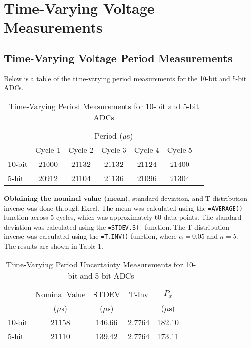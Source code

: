\section{Time-Varying Voltage Measurements}
\subsection{Time-Varying Voltage Period Measurements}

\noindent Below is a table of the time-varying period measurements for the 10-bit and 5-bit ADCs. 
\begin{table}[h]
    \centering
    \caption{Time-Varying Period Measurements for 10-bit and 5-bit ADCs}
    \begin{tabular}{lcccccc}
    \toprule
       & \multicolumn{5}{c}{Period ($\mu$s)}    \\
    \cmidrule{2-6}
       & Cycle 1    & Cycle 2   & Cycle 3   & Cycle 4   & Cycle 5    \\
    \midrule
    10-bit & 21000 & 21132 & 21132 & 21124 & 21400  \\
    5-bit  & 20912 & 21104 & 21136 & 21096 & 21304  \\
    \bottomrule
    \end{tabular}
\end{table}

\noindent \textbf{Obtaining the nominal value (mean)}, standard deviation, and T-distribution inverse was done through Excel. The mean was calculated using the \texttt{=AVERAGE()} function 
across 5 cycles, which was approximately 60 data points. The standard deviation was calculated using the \texttt{=STDEV.S()} function. 
The T-distribution inverse was calculated using the \texttt{=T.INV()} function, where $\alpha = 0.05$ and $n = 5$. The results are shown in Table 
\ref{tab:time-varying-period-uncertainty-measurements}.

\begin{table}[h]
   \centering
   \caption{Time-Varying Period Uncertainty Measurements for 10-bit and 5-bit ADCs}
   \label{tab:time-varying-period-uncertainty-measurements}
   \begin{tabular}{lcccccc}
      \toprule
      & Nominal Value & STDEV & T-Inv & $P_x$ \\
      & ($\mu$s)      & ($\mu$s)           &                        & ($\mu$s)    \\
      \midrule
      10-bit & 21158 & 146.66 & 2.7764 & 182.10 \\
      5-bit  & 21110 & 139.42 & 2.7764 & 173.11 \\
      \bottomrule
   \end{tabular}
\end{table}

